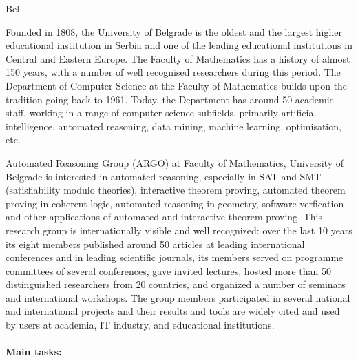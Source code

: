 \begin{sitedescription}{Bel}

  
  Founded in 1808, the University of Belgrade is the oldest and the
  largest higher educational institution in Serbia and one of the
  leading educational institutions in Central and Eastern Europe. The
  Faculty of Mathematics has a history of almost 150 years, with a
  number of well recognised researchers during this period. The
  Department of Computer Science at the Faculty of Mathematics builds
  upon the tradition going back to 1961. Today, the Department has
  around 50 academic staff, working in a range of computer science
  subfields, primarily artificial intelligence, automated reasoning,
  data mining, machine learning, optimisation, etc.

  Automated Reasoning Group (ARGO) at
  Faculty of Mathematics, University of Belgrade is interested in
  automated reasoning, especially in SAT and SMT (satisfiability
  modulo theories), interactive theorem proving, automated theorem
  proving in coherent logic, automated reasoning in geometry, software
  verfication and other applications of automated and interactive
  theorem proving. This research group is internationally visible and
  well recognized: over the last 10 years its eight members published
  around 50 articles at leading international conferences and in
  leading scientific journals, its members served on programme
  committees of several conferences, gave invited lectures, hosted
  more than 50 distinguished researchers from 20 countries, and
  organized a number of seminars and international workshops. The
  group members participated in several national and international
  projects and their results and tools are widely cited and used by
  users at academia, IT industry, and educational institutions.

  \paragraph{Main tasks:}


\end{sitedescription}
